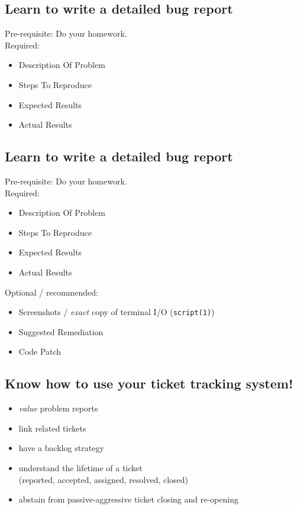 \documentclass[xga]{xdvislides}
\begin{document}
\subsection{Learn to write a detailed bug report}
Pre-requisite: Do your homework. \\

Required:
\begin{itemize}
	\item Description Of Problem
	\item Steps To Reproduce
	\item Expected Results
	\item Actual Results
\end{itemize}

\subsection{Learn to write a detailed bug report}
Pre-requisite: Do your homework. \\

Required:
\begin{itemize}
	\item Description Of Problem
	\item Steps To Reproduce
	\item Expected Results
	\item Actual Results
\end{itemize}
\vspace{.125in}

Optional / recommended:
\begin{itemize}
	\item Screenshots / {\em exact} copy of terminal I/O ({\tt script(1)})
	\item Suggested Remediation
	\item Code Patch
\end{itemize}

\subsection{Know how to use your ticket tracking system!}
\begin{itemize}
	\item {\em value} problem reports
	\item link related tickets
	\item have a backlog strategy
	\item understand the lifetime of a ticket \\
		(reported, accepted, assigned, resolved, closed)
	\item abstain from passive-aggressive ticket
		closing and re-opening
\end{itemize}
\end{document}
